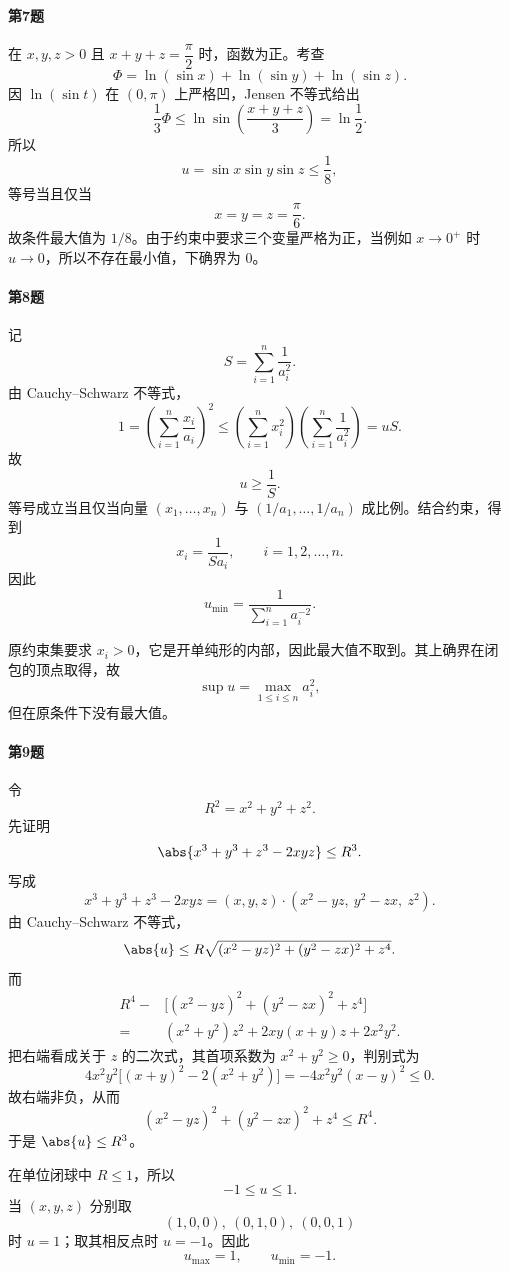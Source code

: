 \paragraph{第7题}
\begin{xsolution}
在 $x,y,z>0$ 且 $x+y+z=\dfrac\pi2$ 时，函数为正。考查
\[
  \Phi=\ln(\sin x)+\ln(\sin y)+\ln(\sin z).
\]
因 $\ln(\sin t)$ 在 $(0,\pi)$ 上严格凹，Jensen 不等式给出
\[
  \frac13\Phi
  \le\ln\sin\left(\frac{x+y+z}{3}\right)
  =\ln\frac12.
\]
所以
\[
  u=\sin x\sin y\sin z\le\frac18,
\]
等号当且仅当
\[
  x=y=z=\frac\pi6.
\]
故条件最大值为 $1/8$。由于约束中要求三个变量严格为正，当例如 $x\to0^+$ 时 $u\to0$，所以不存在最小值，下确界为 $0$。
\end{xsolution}

\paragraph{第8题}
\begin{xsolution}
记
\[
  S=\sum_{i=1}^n\frac1{a_i^2}.
\]
由 Cauchy--Schwarz 不等式，
\[
  1=\left(\sum_{i=1}^n\frac{x_i}{a_i}\right)^2
  \le\left(\sum_{i=1}^n x_i^2\right)
  \left(\sum_{i=1}^n\frac1{a_i^2}\right)=uS.
\]
故
\[
  u\ge\frac1S.
\]
等号成立当且仅当向量 $(x_1,\ldots,x_n)$ 与 $(1/a_1,\ldots,1/a_n)$ 成比例。结合约束，得到
\[
  x_i=\frac{1}{S a_i},
  \qquad i=1,2,\ldots,n.
\]
因此
\[
  u_{\min}=\frac1{\displaystyle\sum_{i=1}^n a_i^{-2}}.
\]

原约束集要求 $x_i>0$，它是开单纯形的内部，因此最大值不取到。其上确界在闭包的顶点取得，故
\[
  \sup u=\max_{1\le i\le n}a_i^2,
\]
但在原条件下没有最大值。
\end{xsolution}

\paragraph{第9题}
\begin{xsolution}
令
\[
  R^2=x^2+y^2+z^2.
\]
先证明
\[
  \abs{x^3+y^3+z^3-2xyz}\le R^3.
\]
写成
\[
  x^3+y^3+z^3-2xyz
  =(x,y,z)\cdot(x^2-yz,\ y^2-zx,\ z^2).
\]
由 Cauchy--Schwarz 不等式，
\[
  \abs{u}
  \le R\sqrt{(x^2-yz)^2+(y^2-zx)^2+z^4}.
\]
而
\[
\begin{aligned}
  R^4-&\bigl[(x^2-yz)^2+(y^2-zx)^2+z^4\bigr]\\
  ={}&(x^2+y^2)z^2+2xy(x+y)z+2x^2y^2.
\end{aligned}
\]
把右端看成关于 $z$ 的二次式，其首项系数为 $x^2+y^2\ge0$，判别式为
\[
  4x^2y^2\bigl[(x+y)^2-2(x^2+y^2)\bigr]
  =-4x^2y^2(x-y)^2\le0.
\]
故右端非负，从而
\[
  (x^2-yz)^2+(y^2-zx)^2+z^4\le R^4.
\]
于是 $\abs{u}\le R^3$。

在单位闭球中 $R\le1$，所以
\[
  -1\le u\le1.
\]
当 $(x,y,z)$ 分别取
\[
  (1,0,0),\ (0,1,0),\ (0,0,1)
\]
时 $u=1$；取其相反点时 $u=-1$。因此
\[
  u_{\max}=1,
  \qquad
  u_{\min}=-1.
\]
\end{xsolution}

